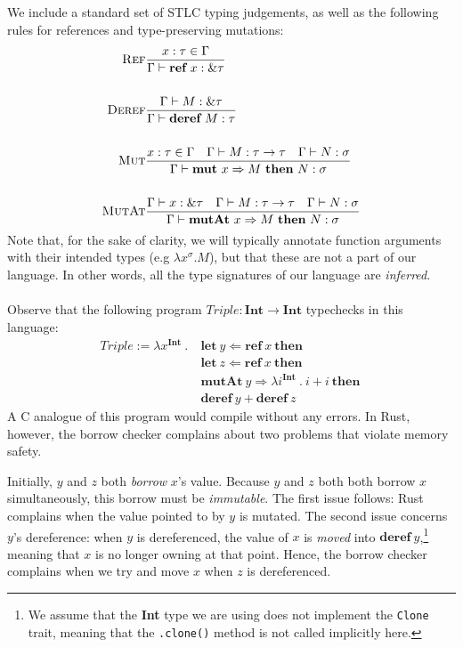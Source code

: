 \documentclass{article}
\newcommand{\mkref}{\textbf{ref}~}
\newcommand{\deref}{\textbf{deref}~}%
\newcommand{\mutate}[3]{\textbf{mut}~ #1 \Rightarrow #2 ~\textbf{then}~ #3}
\newcommand{\mutptr}[3]{\textbf{mutAt}~ #1 \Rightarrow #2 ~\textbf{then}~ #3}
\newcommand{\letvar}[3]{\textbf{let}~ #1 \Leftarrow #2 ~\textbf{then}~ #3}
\newcommand{\judge}[3]{\textsc{#1}&\frac{#2}{#3}}
\begin{document}
We include a standard set of STLC typing judgements, as well as the following rules for references and type-preserving mutations:
\begin{align*}
    \judge{Ref}{x : \tau \in \Gamma}{\Gamma \vdash \mkref x : \& \tau}\\
    ~\\
    \judge{Deref}{\Gamma \vdash M : \& \tau}{\Gamma \vdash \deref M : \tau}\\
    ~\\
    \judge{Mut}{x : \tau \in \Gamma \hspace{1em} \Gamma \vdash M : \tau \rightarrow \tau \hspace{1em} \Gamma \vdash N : \sigma }{\Gamma \vdash \mutate{x}{M}{N} : \sigma}\\
    ~\\
    \judge{MutAt}{ \Gamma \vdash x : \& \tau \hspace{1em} \Gamma \vdash M : \tau \rightarrow \tau \hspace{1em} \Gamma \vdash N : \sigma }{\Gamma \vdash \mutptr{x}{M}{N} : \sigma }
\end{align*}
Note that, for the sake of clarity, we will typically annotate function arguments with their intended types (e.g $\lambda x^\sigma . M$), but that these are not a part of our language. In other words, all the type signatures of our language are \textit{inferred}.
\\~\\
Observe that the following program $Triple : \textbf{Int} \rightarrow \textbf{Int}$ typechecks in this language:
\begin{align*}
    Triple := \lambda x^{\textbf{Int}} ~.~ &\letvar{y}{\mkref x}{}\\  %
    &\letvar{z}{\mkref x}{}\\
    & \mutptr{y}{ \lambda i^{\textbf{Int}} ~.~ i + i }{} \\
    &\deref y + \deref z
\end{align*}
A C analogue of this program would compile without any errors. In Rust, however, the borrow checker complains about two problems that violate memory safety. 

Initially, $y$ and $z$ both \textit{borrow} $x$'s value. Because $y$ and $z$ both both borrow $x$ simultaneously, this borrow must be \textit{immutable}. The first issue follows: Rust complains when the value pointed to by $y$ is mutated. The second issue concerns $y$'s dereference: when $y$ is dereferenced, the value of $x$ is \textit{moved} into $\deref y$,\footnote{We assume that the \textbf{Int} type we are using does not implement the \texttt{Clone} trait, meaning that the \texttt{.clone()} method is not called implicitly here.} meaning that $x$ is no longer owning at that point. Hence, the borrow checker complains when we try and move $x$ when $z$ is dereferenced. 
\end{document}
